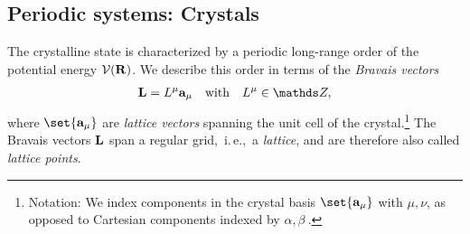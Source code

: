 \subsection{Periodic systems: Crystals}
{The crystalline state is characterized by a periodic long-range order of the potential energy $\mathcal V ({\bf R})$}. We describe this order in terms of the \emph{Bravais vectors} 
\begin{align}
	{\bf L} = L^\mu {\bf a}_\mu \quad\text{with}\quad L^\mu \in \mathds Z,
	\label{eq:L_Bravais}
\end{align}
where $\set{{\bf a}_\mu}$ are \emph{lattice vectors} spanning the unit cell of the %
crystal.\footnote{Notation: We index components in the crystal basis $\set{{\bf a}_\mu}$ with $\mu, \nu$, as opposed to Cartesian components indexed by $\alpha, \beta~.$} The Bravais vectors $\bf L$ span a regular grid,~i.\,e.,~a \emph{lattice}, and are therefore also called \emph{lattice points}.

